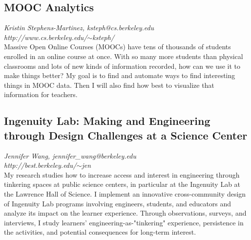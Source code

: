 \documentclass[foldmark,10pt,a4paper,notumble]{leaflet}
\begin{document}
\subsection{MOOC Analytics}
\emph{Kristin Stephens-Martinez, ksteph@cs.berkeley.edu}\\
\emph{http://www.cs.berkeley.edu/$\sim$ksteph/}\\
Massive Open Online Courses (MOOCs) have tens of thousands of students enrolled in an online course at once. With so many more students than physical classrooms and lots of new kinds of information recorded, how can we use it to make things better? My goal is to find and automate ways to find interesting things in MOOC data. Then I will also find how best to visualize that information for teachers.

\subsection{Ingenuity Lab: Making and Engineering through Design Challenges at a Science Center}
\emph{Jennifer Wang, jennifer\_wang@berkeley.edu}\\
\emph{http://best.berkeley.edu/$\sim$jen}\\
My research studies how to increase access and interest in engineering through tinkering spaces at public science centers, in particular at the Ingenuity Lab at the Lawrence Hall of Science. I implement an innovative cross-community design of Ingenuity Lab programs involving engineers, students, and educators and analyze its impact on the learner experience. Through observations, surveys, and interviews, I study learners' engineering-as-"tinkering" experience, persistence in the activities, and potential consequences for long-term interest.
\end{document}
